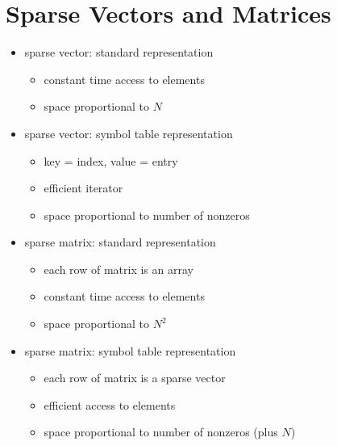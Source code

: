 \documentclass[8pt,a4paper,compress]{beamer}
\begin{document}
\section{Sparse Vectors and Matrices}
\begin{frame}[fragile]
\begin{itemize}
\item sparse vector: standard representation
\begin{itemize}
\item constant time access to elements

\item space proportional to $N$
\end{itemize}

\item sparse vector: symbol table representation
\begin{itemize}
\item key = index, value = entry

\item efficient iterator

\item space proportional to number of nonzeros
\end{itemize}

\item sparse matrix: standard representation
\begin{itemize}
\item each row of matrix is an array

\item constant time access to elements

\item space proportional to $N^2$
\end{itemize}

\item sparse matrix: symbol table representation
\begin{itemize}
\item each row of matrix is a sparse vector

\item efficient access to elements

\item space proportional to number of nonzeros (plus $N$)
\end{itemize}

\end{itemize}
\end{frame}
\end{document}
